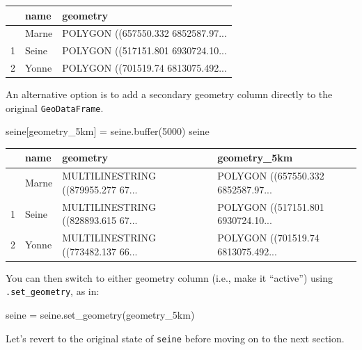 \documentclass[
  letterpaper,
]{krantz}
\newenvironment{Shaded}{\begin{snugshade}}{\end{snugshade}}
\newcommand{\BuiltInTok}[1]{\textcolor[rgb]{0.00,0.23,0.31}{#1}}
\newcommand{\DecValTok}[1]{\textcolor[rgb]{0.68,0.00,0.00}{#1}}
\newcommand{\NormalTok}[1]{\textcolor[rgb]{0.00,0.23,0.31}{#1}}
\newcommand{\OperatorTok}[1]{\textcolor[rgb]{0.37,0.37,0.37}{#1}}
\newcommand{\StringTok}[1]{\textcolor[rgb]{0.13,0.47,0.30}{#1}}
\begin{document}
\begin{longtable}[]{@{}lll@{}}
\toprule\noalign{}
& name & geometry \\
\midrule\noalign{}
\endhead
\bottomrule\noalign{}
\endlastfoot
0 & Marne & POLYGON ((657550.332 6852587.97... \\
1 & Seine & POLYGON ((517151.801 6930724.10... \\
2 & Yonne & POLYGON ((701519.74 6813075.492... \\
\end{longtable}

An alternative option is to add a secondary geometry column directly to
the original \texttt{GeoDataFrame}.

\begin{Shaded}
\begin{Highlighting}[]
\NormalTok{seine[}\StringTok{\textquotesingle{}geometry\_5km\textquotesingle{}}\NormalTok{] }\OperatorTok{=}\NormalTok{ seine.}\BuiltInTok{buffer}\NormalTok{(}\DecValTok{5000}\NormalTok{)}
\NormalTok{seine}
\end{Highlighting}
\end{Shaded}

\begin{longtable}[]{@{}llll@{}}
\toprule\noalign{}
& name & geometry & geometry\_5km \\
\midrule\noalign{}
\endhead
\bottomrule\noalign{}
\endlastfoot
0 & Marne & MULTILINESTRING ((879955.277 67... & POLYGON ((657550.332
6852587.97... \\
1 & Seine & MULTILINESTRING ((828893.615 67... & POLYGON ((517151.801
6930724.10... \\
2 & Yonne & MULTILINESTRING ((773482.137 66... & POLYGON ((701519.74
6813075.492... \\
\end{longtable}

You can then switch to either geometry column (i.e., make it ``active'')
using \texttt{.set\_geometry}, as in:

\begin{Shaded}
\begin{Highlighting}[]
\NormalTok{seine }\OperatorTok{=}\NormalTok{ seine.set\_geometry(}\StringTok{\textquotesingle{}geometry\_5km\textquotesingle{}}\NormalTok{)}
\end{Highlighting}
\end{Shaded}

Let's revert to the original state of \texttt{seine} before moving on to
the next section.
\end{document}
